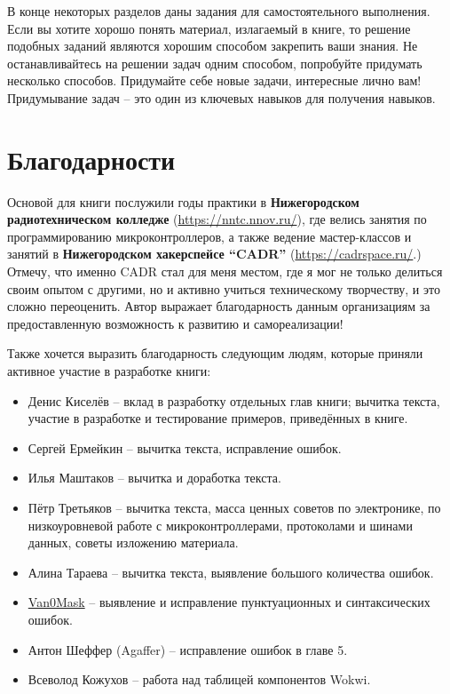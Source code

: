 \documentclass[../sparc.tex]{subfiles}
\begin{document}
В конце некоторых разделов даны задания для самостоятельного выполнения.  Если
вы хотите хорошо понять материал, излагаемый в книге, то решение подобных
заданий являются хорошим способом закрепить ваши знания.  Не останавливайтесь на
решении задач одним способом, попробуйте придумать несколько способов.
Придумайте себе новые задачи, интересные лично вам!  Придумывание задач -- это
один из ключевых навыков для получения навыков.

\section*{Благодарности}

Основой для книги послужили годы практики в \textbf{Нижегородском
  радиотехническом колледже} (\url{https://nntc.nnov.ru/}), где велись занятия
по программированию микроконтроллеров, а также ведение мастер-классов и занятий
в \textbf{Нижегородском хакерспейсе ``CADR''} (\url{https://cadrspace.ru/}.)
Отмечу, что именно CADR стал для меня местом, где я мог не только делиться своим
опытом с другими, но и активно учиться техническому творчеству, и это сложно
переоценить.  Автор выражает благодарность данным организациям за
предоставленную возможность к развитию и самореализации!

Также хочется выразить благодарность следующим людям, которые приняли активное
участие в разработке книги:
\begin{itemize}
\item Денис Киселёв -- вклад в разработку отдельных глав книги; вычитка текста,
  участие в разработке и тестирование примеров, приведённых в книге.
\item Сергей Ермейкин -- вычитка текста, исправление ошибок.
\item Илья Маштаков – вычитка и доработка текста.
\item Пётр Третьяков -- вычитка текста, масса ценных советов по электронике,
  по низкоуровневой работе с микроконтроллерами, протоколами и шинами данных,
  советы изложению материала.
\item Алина Тараева -- вычитка текста, выявление большого количества ошибок.
\item \href{https://github.com/V4n0M4sk}{Van0Mask} -- выявление и исправление
  пунктуационных и синтаксических ошибок.
\item Антон Шеффер (Agaffer) -- исправление ошибок в главе 5.
\item Всеволод Кожухов -- работа над таблицей компонентов Wokwi.
\end{itemize}
\end{document}
